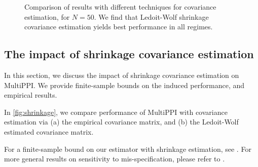 \documentclass{article} %
\begin{document}
\begin{figure}
{
}
    \caption{Comparison of results with different techniques for covariance estimation, for $N=50$. We find that Ledoit-Wolf shrinkage covariance estimation yields best performance in all regimes.}
    \label{fig:shrinkage}
\end{figure}

\subsection{The impact of shrinkage covariance estimation}

In this section, we discuss the impact of shrinkage covariance estimation on MultiPPI. We provide finite-sample bounds on the induced performance, and empirical results.

In \autoref{fig:shrinkage}, we compare performance of MultiPPI with covariance estimation via (a) the empirical covariance matrix, and (b) the Ledoit-Wolf estimated covariance matrix.

For a finite-sample bound on our estimator with shrinkage estimation, see .
For more general results on {sensitivity to mis-specification,} please refer to . 
\end{document}
